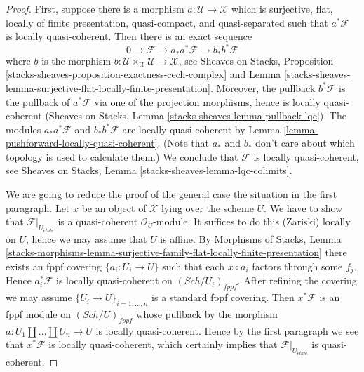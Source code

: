 \documentclass[10pt,a4paper]{amsart}
\theoremstyle{plain}
\theoremstyle{definition}
\theoremstyle{remark}
\numberwithin{equation}{subsection}
\def\Sch{\mathit{Sch}}
\def\etale{{\acute{e}tale}}
\begin{document}
\begin{proof}
First, suppose there is a morphism $a : \mathcal{U} \to \mathcal{X}$
which is surjective, flat, locally of finite presentation, quasi-compact,
and quasi-separated such that $a^*\mathcal{F}$ is locally quasi-coherent.
Then there is an exact sequence
$$
0 \to \mathcal{F} \to a_*a^*\mathcal{F} \to b_*b^*\mathcal{F}
$$
where $b$ is the morphism
$b : \mathcal{U} \times_\mathcal{X} \mathcal{U} \to \mathcal{X}$, see
Sheaves on Stacks, Proposition
\ref{stacks-sheaves-proposition-exactness-cech-complex} and
Lemma \ref{stacks-sheaves-lemma-surjective-flat-locally-finite-presentation}.
Moreover, the pullback $b^*\mathcal{F}$ is the pullback of $a^*\mathcal{F}$
via one of the projection morphisms, hence is locally quasi-coherent
(Sheaves on Stacks, Lemma \ref{stacks-sheaves-lemma-pullback-lqc}).
The modules $a_*a^*\mathcal{F}$ and $b_*b^*\mathcal{F}$ are locally
quasi-coherent by Lemma \ref{lemma-pushforward-locally-quasi-coherent}.
(Note that $a_*$ and $b_*$ don't care about which topology is
used to calculate them.)
We conclude that $\mathcal{F}$ is locally quasi-coherent, see
Sheaves on Stacks, Lemma \ref{stacks-sheaves-lemma-lqc-colimits}.

\medskip\noindent
We are going to reduce the proof of the general case the
situation in the first paragraph. Let $x$ be an object of $\mathcal{X}$
lying over the scheme $U$. We have to show that
$\mathcal{F}|_{U_\etale}$ is a quasi-coherent $\mathcal{O}_U$-module.
It suffices to do this (Zariski) locally on $U$, hence we may
assume that $U$ is affine. By
Morphisms of Stacks, Lemma
\ref{stacks-morphisms-lemma-surjective-family-flat-locally-finite-presentation}
there exists an fppf covering $\{a_i : U_i \to U\}$ such that
each $x \circ a_i$ factors through some $f_j$. Hence $a_i^*\mathcal{F}$
is locally quasi-coherent on $(\Sch/U_i)_{fppf}$. After refining
the covering we may assume $\{U_i \to U\}_{i = 1, \ldots, n}$
is a standard fppf covering. Then $x^*\mathcal{F}$ is an fppf
module on $(\Sch/U)_{fppf}$ whose pullback by the morphism
$a : U_1 \amalg \ldots \amalg U_n \to U$ is locally quasi-coherent.
Hence by the first paragraph we see that $x^*\mathcal{F}$ is locally
quasi-coherent, which certainly implies that $\mathcal{F}|_{U_\etale}$
is quasi-coherent.
\end{proof}
\end{document}
